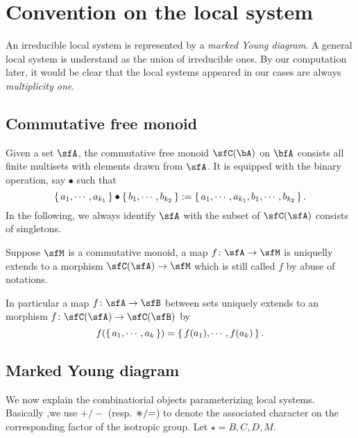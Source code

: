 \documentclass[12pt,a4paper]{amsart}
\numberwithin{equation}{section}
\theoremstyle{remark}
\def\umm{{=}}
\def\upp{{\ast}}
\def\upp{
  {{\setbox0\hbox{$\times$}
      \rlap{\hbox to \wd0{\hss$+$\hss}}\box0
    }}
}
\begin{document}
\section{Convention on the local system}
An irreducible local system is represented by a {\emph{marked Young
    diagram}}. A general local system is understand as the
union of irreducible ones. By our computation later, it would be clear that the
local systems appeared in our cases are always \emph{multiplicity one}.


\subsection{Commutative free monoid}
Given a  set $\sfA$, the commutative free monoid $\sfC(\bA)$ on $\bfA$ consists all finite multisets with
elements drawn from $\sfA$.
It is equipped with the binary operation, say $\bullet$ such that
\[
  \set{a_{1},\cdots, a_{k_{1}}}\bullet \set{b_{1},\cdots, b_{k_{2}}} :=
  \set{a_{1},\cdots, a_{k_{1}},b_{1},\cdots, b_{k_{2}}}.
\]
In the following, we always identify $\sfA$ with the subset of $\sfC(\sfA)$
consists of singletons.

Suppose $\sfM$ is a commutative monoid, a map $f\colon \sfA\rightarrow \sfM$ is
uniquelly extends to a morphism $\sfC(\sfA)\rightarrow \sfM$ which is still
called $f$ by abuse of notations.

In particular a map $f\colon \sfA\rightarrow \sfB$ between sets uniquely extends to an morphism
$f\colon \sfC(\sfA)\rightarrow \sfC(\sfB)$ by
\[
  f(\set{a_{1},\cdots, a_{k}}) = \set{f(a_{1}), \cdots, f(a_{k})}.
\]

\subsection{Marked Young diagram}
We now explain the combinatiorial objects parameterizing local systems.
Basically ,we use $+/-$ (resp. $\upp/\umm$) to denote the associated character on the
corresponding factor of the isotropic group.
Let $\star=B,C,D,M$.
\end{document}
